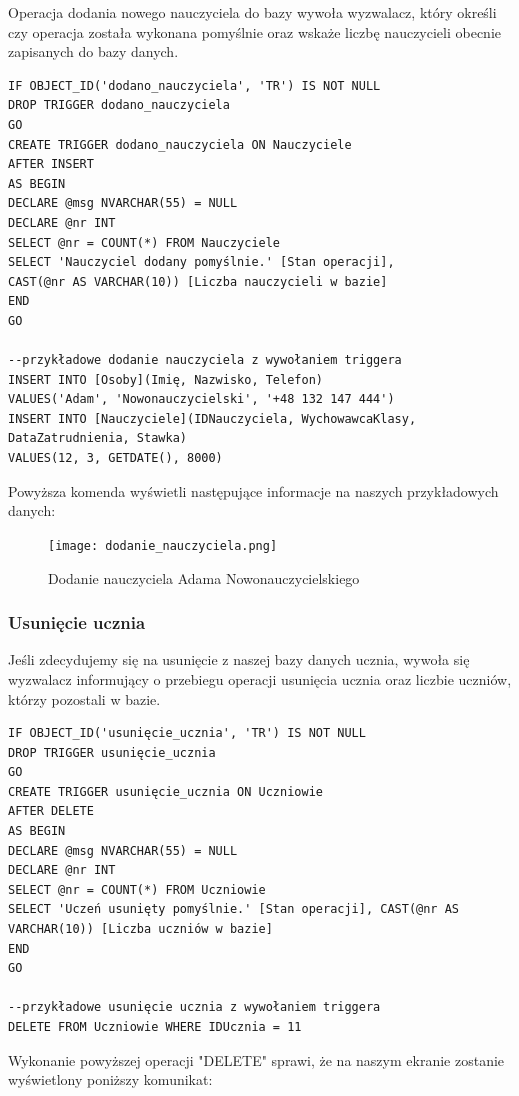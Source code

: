 \documentclass[60pt]{article}
\begin{document}
Operacja dodania nowego nauczyciela do bazy wywoła wyzwalacz, który określi czy operacja została wykonana pomyślnie oraz wskaże liczbę nauczycieli obecnie zapisanych do bazy danych.

\begin{verbatim}
IF OBJECT_ID('dodano_nauczyciela', 'TR') IS NOT NULL
DROP TRIGGER dodano_nauczyciela
GO
CREATE TRIGGER dodano_nauczyciela ON Nauczyciele
AFTER INSERT
AS BEGIN
DECLARE @msg NVARCHAR(55) = NULL
DECLARE @nr INT
SELECT @nr = COUNT(*) FROM Nauczyciele
SELECT 'Nauczyciel dodany pomyślnie.' [Stan operacji], 
CAST(@nr AS VARCHAR(10)) [Liczba nauczycieli w bazie]
END
GO

--przykładowe dodanie nauczyciela z wywołaniem triggera
INSERT INTO [Osoby](Imię, Nazwisko, Telefon) 
VALUES('Adam', 'Nowonauczycielski', '+48 132 147 444')
INSERT INTO [Nauczyciele](IDNauczyciela, WychowawcaKlasy, DataZatrudnienia, Stawka)
VALUES(12, 3, GETDATE(), 8000)
\end{verbatim}

Powyższa komenda wyświetli następujące informacje na naszych przykładowych danych:

\begin{figure}[h]
  \texttt{[image: dodanie\_nauczyciela.png]}
  \caption{Dodanie nauczyciela Adama Nowonauczycielskiego}
  \label{Dodanie nauczyciela Adama Nowonauczycielskiego}
\end{figure}

\subsubsection{Usunięcie ucznia}

Jeśli zdecydujemy się na usunięcie z naszej bazy danych ucznia, wywoła się wyzwalacz informujący o przebiegu operacji usunięcia ucznia oraz liczbie uczniów, którzy pozostali w bazie. 

\begin{verbatim}
IF OBJECT_ID('usunięcie_ucznia', 'TR') IS NOT NULL
DROP TRIGGER usunięcie_ucznia
GO
CREATE TRIGGER usunięcie_ucznia ON Uczniowie
AFTER DELETE
AS BEGIN
DECLARE @msg NVARCHAR(55) = NULL
DECLARE @nr INT
SELECT @nr = COUNT(*) FROM Uczniowie
SELECT 'Uczeń usunięty pomyślnie.' [Stan operacji], CAST(@nr AS VARCHAR(10)) [Liczba uczniów w bazie]
END
GO

--przykładowe usunięcie ucznia z wywołaniem triggera
DELETE FROM Uczniowie WHERE IDUcznia = 11
\end{verbatim}

Wykonanie powyższej operacji "DELETE" sprawi, że na naszym ekranie zostanie wyświetlony poniższy komunikat:
\end{document}
